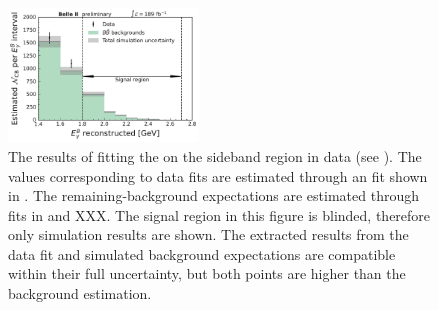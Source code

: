 \begin{figure}[htbp!]
    \centering
    \includegraphics[width=0.45\textwidth]{figures/data_validation/sidebands_background_vs_data.pdf}
    \caption{\label{fig:sidebands_background_versus_data} The results of fitting the \Mbc on the sideband region in data (see ).
    The values corresponding to data fits are estimated through an \Mbc fit shown in .
    The remaining-\BB background expectations are estimated through \Mbc fits in  and XXX.
    The signal region in this figure is blinded, therefore only simulation results are shown.
    The extracted results from the data fit and simulated background expectations 
    are compatible within their full uncertainty, but both points are higher than the background estimation.
    }
\end{figure}


